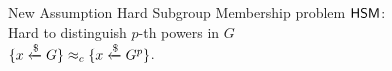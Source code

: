 {
\begin{frame}[standout]{New Assumption}
Hard Subgroup Membership problem \textcolor{mLightBrown}{$\mathsf{HSM}$}: \\Hard to distinguish $p$-th powers in $G$ \\$\{x\xleftarrow{\$} G\} \approx_c \{x\xleftarrow{\$} G^p\}$.
\end{frame}
}